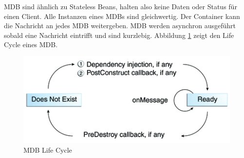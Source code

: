 MDB sind ähnlich zu Stateless Beans, halten also keine Daten oder Status für einen Client. Alle Instanzen eines MDBs sind gleichwertig. Der Container kann die Nachricht an jedes MDB weitergeben. MDB werden asynchron ausgeführt sobald eine Nachricht eintrifft und sind kurzlebig. Abbildung \ref{fig:mdb-lifecycle} zeigt den Life Cycle eines MDB.

\begin{figure}
\centering
\includegraphics[width=0.7\linewidth]{fig/mdb-lifecycle}
\caption{MDB Life Cycle}
\label{fig:mdb-lifecycle}
\end{figure}